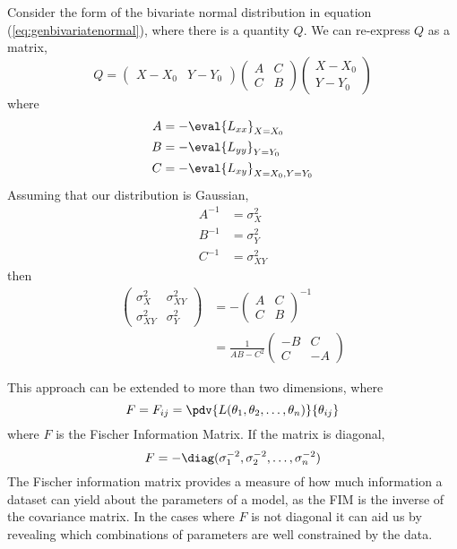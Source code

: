 \documentclass{dwnotes}         		        %
\begin{document}
Consider the form of the bivariate normal distribution in equation
(\ref{eq:genbivariatenormal}), where there is a quantity $Q$. We can
re-express $Q$ as a matrix,
\begin{equation}
  \label{eq:1}
  Q =
  \begin{pmatrix}
    X-X_0 & Y-Y_0
  \end{pmatrix}
  \begin{pmatrix}
    A & C \\ C & B
  \end{pmatrix}
  \begin{pmatrix}
    X-X_0 \\ Y-Y_0
  \end{pmatrix}
\end{equation}
where
\begin{align*}
  A &= - \eval{ L_{xx} }_{X=X_0} \\
  B &= - \eval{ L_{yy} }_{Y=Y_0} \\
  C &= - \eval{ L_{xy} }_{X=X_0, Y=Y_0}
\end{align*}
Assuming that our distribution is Gaussian,
\begin{align*}
  A^{-1} &= \sigma_X^2 \\
  B^{-1} &= \sigma_Y^2 \\
  C^{-1} &= \sigma_{XY}^2
\end{align*}
then
\begin{align*}
  \begin{pmatrix}
    \sigma_X^2 & \sigma_{XY}^2 \\ \sigma_{XY}^2 & \sigma_Y^2
  \end{pmatrix} &=
-
\begin{pmatrix}
  A & C \\ C & B
\end{pmatrix}^{-1} \\
&= \frac{1}{AB - C^2}
\begin{pmatrix}
  - B & C \\ C & -A
\end{pmatrix}
\end{align*}

This approach can be extended to more than two dimensions, where
\begin{equation}
  \label{eq:2}
  F = F_{ij} = \pdv{L(\theta_1, \theta_2, \dots, \theta_n)}{\theta_{ij}}
\end{equation}
where $F$ is the Fischer Information Matrix. If the matrix is diagonal,
\[ F = - \diag( \sigma_1^{-2}, \sigma_2^{-2}, \dots, \sigma_n^{-2}
) \]The Fischer information matrix provides a measure of how much
information a dataset can yield about the parameters of a model, as
the FIM is the inverse of the covariance matrix. In the cases where
$F$ is not diagonal it can aid us by revealing which combinations of
parameters are well constrained by the data.
\end{document}
